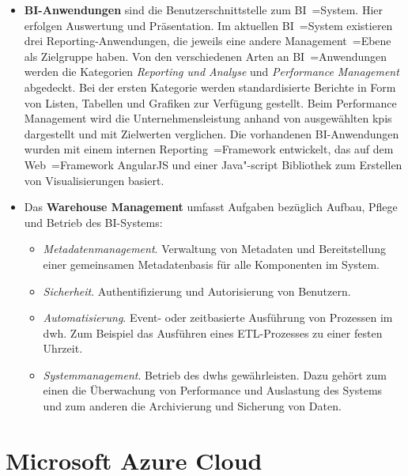 \begin{itemize}
\item \textbf{BI-Anwendungen} sind die Benutzerschnittstelle zum BI~=System. Hier erfolgen Auswertung und Präsentation. Im aktuellen BI~=System existieren drei Reporting-Anwendungen, die jeweils eine andere Management~=Ebene als Zielgruppe haben. Von den verschiedenen Arten an BI~=Anwendungen werden die Kategorien \textit{Reporting und Analyse} und \textit{Performance Management} abgedeckt. Bei der ersten Kategorie werden standardisierte Berichte in Form von Listen, Tabellen und Grafiken zur Verfügung gestellt. Beim {Performance Management} wird die Unternehmensleistung anhand von ausgewählten \acp{kpi} dargestellt und mit Zielwerten verglichen. Die vorhandenen BI-Anwendungen wurden mit einem internen Reporting~=Framework entwickelt, das auf dem Web~=Framework AngularJS und einer Java"-script Bibliothek zum Erstellen von Visualisierungen basiert.
\item Das \textbf{Warehouse Management} umfasst Aufgaben bezüglich Aufbau, Pflege und Betrieb des BI-Systems:
\begin{itemize}
\item \textit{Metadatenmanagement}. Verwaltung von Metadaten und Bereitstellung einer gemeinsamen Metadatenbasis für alle Komponenten im System.
\item \textit{Sicherheit}. Authentifizierung und Autorisierung von Benutzern.
\item \textit{Automatisierung}. Event- oder zeitbasierte Ausführung von Prozessen im \ac{dwh}. Zum Beispiel das Ausführen eines ETL-Prozesses zu einer festen Uhrzeit.
\item \textit{Systemmanagement}. Betrieb des \ac{dwh}s gewährleisten. Dazu gehört zum einen die Überwachung von Performance und Auslastung des Systems und zum anderen die Archivierung und Sicherung von Daten.
\end{itemize}
\end{itemize}

\section{Microsoft Azure Cloud} \label{sec:grundlagen:bi_in_der_cloud_mit_azure}

